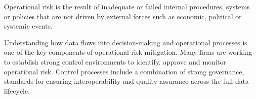 %
%
Operational risk is the result of inadequate or
failed internal procedures, systems or policies that are not driven by external forces such as
economic, political or systemic events.

Understanding how data flows into decision-making and operational processes is one of the key components of
operational risk mitigation.
Many firms are working to establish strong control environments to identify, approve and monitor operational risk.
Control processes include a combination of strong governance, standards for ensuring interoperability and
quality assurance across the full data lifecycle.


